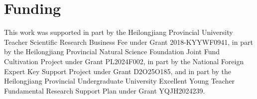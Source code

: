 \documentclass[review,11pt,times]{elsarticle}
\begin{document}
\section*{Funding}
This work was supported in part by the Heilongjiang Provincial University Teacher Scientific Research Business Fee under Grant 2018-KYYWF0941, in part by the Heilongjiang Provincial Natural Science Foundation Joint Fund Cultivation Project under Grant PL2024F002, in part by the National Foreign Expert Key Support Project under Grant D2O25O185, and in part by the Heilongjiang Provincial Undergraduate University Excellent Young Teacher Fundamental Research Support Plan under Grant YQJH2024239.





\end{document}
